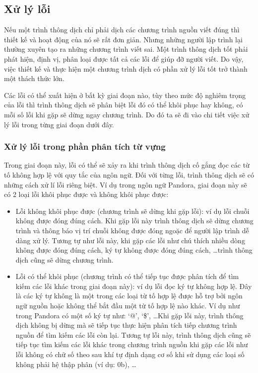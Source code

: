 \subsection{Xử lý lỗi}
Nếu một trình thông dịch chỉ phải dịch các chương trình nguồn viết đúng thì thiết kế và hoạt động của nó sẽ rất đơn giản. Nhưng những người lập trình lại thường xuyên tạo ra những chương trình viết sai. Một trình thông dịch tốt phải phát hiện, định vị, phân loại được tất cả các lỗi để giúp đỡ người viết. Do vậy, việc thiết kế và thực hiện một chương trình dịch có phần xử lý lỗi tốt trở thành một thách thức lớn.

Các lỗi có thể xuất hiện ở bất kỳ giai đoạn nào, tùy theo mức độ nghiêm trọng của lỗi thì trình thông dịch sẽ phân biệt lỗi đó có thể khôi phục hay không, có mỗi số lỗi khi gặp sẽ dừng ngay chương trình. Do đó ta sẽ đi vào chi tiết việc xử lý lỗi trong từng giai đoạn dưới đây.

\subsubsection{Xử lý lỗi trong phần phân tích từ vựng}
Trong giai đoạn này, lỗi có thể sẽ xảy ra khi trình thông dịch cố gắng đọc các từ tố không hợp lệ với quy tắc của ngôn ngữ. Đối với từng lỗi, trình thông dịch sẽ có những cách xử lí lỗi riêng biệt. Ví dụ trong ngôn ngữ Pandora, giai đoạn này sẽ có 2 loại lỗi khôi phục được và không khôi phục được:

\begin{itemize}
    \item Lỗi không khôi phục được (chương trình sẽ dừng khi gặp lỗi): ví dụ lỗi chuỗi không được đóng đúng cách. Khi gặp lỗi này trình thông dịch sẽ dừng chương trình và thông báo vị trí chuỗi không được đóng ngoặc để người lập trình dễ dàng xử lý. Tương tự như lỗi này, khi gặp các lỗi như chú thích nhiều dòng không được đóng đúng cách, ký tự không được đóng đúng cách, \dots trình thông dịch cũng sẽ dừng chương trình.
    \item Lỗi có thể khôi phục (chương trình có thể tiếp tục được phân tích để tìm kiếm các lỗi khác trong giai đoạn này): ví dụ lỗi đọc ký tự không hợp lệ. Đây là các ký tự không là một trong các loại từ tố hợp lệ được hỗ trợ bởi ngôn ngữ nguồn hoặc không thể bắt đầu một từ tố hợp lệ nào khác. Ví dụ như trong Pandora có một số ký tự như: `@', `\$', \dots Khi gặp lỗi này, trình thông dịch không bị dừng mà sẽ tiếp tục thực hiện phân tích tiếp chương trình nguồn để tìm kiếm các lỗi còn lại. Tương tự lỗi này, trình thông dịch cũng sẽ tiếp tục tìm kiếm các lỗi khác trong chương trình nguồn khi gặp các lỗi như lỗi không có chữ số theo sau khí tự định dạng cơ số khi sử dụng các loại số không phải hệ thập phân (ví dụ: 0b), \dots
\end{itemize}

